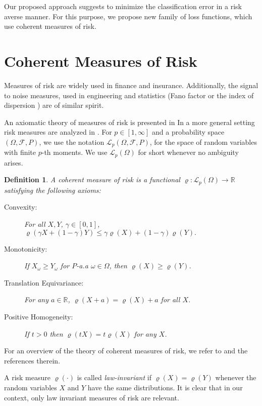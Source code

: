\documentclass[10pt,letterpaper]{article}
\newcommand{\R}{\mathbb{R}}
\newcommand{\Fc}{\mathcal{F}}
\newcommand{\Lc}{\mathcal{L}}
\newcommand{\1}{1{\hskip -2.55 pt}\hbox{I}}
\newtheorem{definition}[theorem]{Definition}
\begin{document}
Our proposed approach suggests to minimize the classification error in a risk averse manner.
For this purpose, we propose new family of loss functions, which use coherent measures of risk. 


\section{Coherent Measures of Risk} %
\label{sec:coherent_measure_of_risk}


Measures of risk are widely used in finance and insurance. Additionally, the signal to noise measures, used in engineering and statistics (Fano factor \cite{fano1947ionization} or the index of dispersion \cite{cox1966statistical}) are of similar spirit.

An axiomatic theory of measures of risk is presented in \cite{ogryczak1999stochastic,artzner1999coherent,follmer2011stochastic,kijima1993mean,rockafellar2006generalized}
In a more general setting risk measures are analyzed in \cite{ruszczynski2006optimization}. For $p\in [1,\infty]$
and a probability space $(\varOmega,{\Fc},P)$, we use the notation ${\Lc}_p(\varOmega,{\Fc},P)$, for the space of random variables with finite $p$-th moments. We use $\Lc_p(\varOmega)$ for short whenever no ambiguity arises.

\begin{definition} A {\em coherent measure of risk} is a functional $\varrho: \Lc_p(\varOmega)\to \R$ satisfying the following axioms:
\begin{description}
\item[Convexity:] For all $X,Y$, $\gamma\in [0,1]$, $\varrho(\gamma X + (1-\gamma)Y) \le \gamma \varrho(X) + (1-\gamma)\varrho(Y).$
\item[Monotonicity:] If  $X_\omega\ge  Y_\omega$ for $P$-a.a $\omega\in\varOmega$, then $\varrho(X)\ge \varrho(Y)$.
\item[Translation Equivariance:] For any $a\in \R$,  $\varrho(X+a)=\varrho(X)+ a$ for all $X$.
\item[Positive Homogeneity:] If $t>0$ then $\varrho(t X)=t\varrho(X)$ for any $X$.
\end{description}
\end{definition}
For an overview of the theory of coherent measures of risk, we refer to  \cite{shapiro2014lectures} and the references therein.

A risk measure $\varrho(\cdot)$  is called \emph{law-invariant} if $\varrho(X)=\varrho(Y)$ whenever the random variables $X$ and $Y$ have the same distributions. It is clear that in our context, only law invariant measures of risk are relevant.
\end{document}
